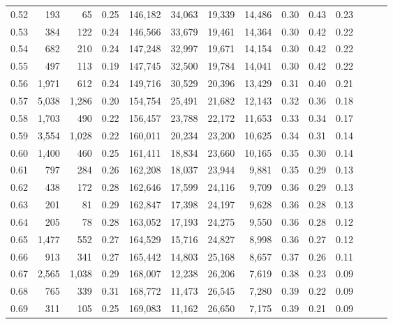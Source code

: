 \begin{tabular}{rrrrrrrrrrrrrr}
0.52 &     193 &     65 &  0.25 &  146,182 &   34,063 &  19,339 &  14,486 &  0.30 &  0.43 &      0.23 \\
0.53 &     384 &    122 &  0.24 &  146,566 &   33,679 &  19,461 &  14,364 &  0.30 &  0.42 &      0.22 \\
0.54 &     682 &    210 &  0.24 &  147,248 &   32,997 &  19,671 &  14,154 &  0.30 &  0.42 &      0.22 \\
0.55 &     497 &    113 &  0.19 &  147,745 &   32,500 &  19,784 &  14,041 &  0.30 &  0.42 &      0.22 \\
0.56 &   1,971 &    612 &  0.24 &  149,716 &   30,529 &  20,396 &  13,429 &  0.31 &  0.40 &      0.21 \\
0.57 &   5,038 &  1,286 &  0.20 &  154,754 &   25,491 &  21,682 &  12,143 &  0.32 &  0.36 &      0.18 \\
0.58 &   1,703 &    490 &  0.22 &  156,457 &   23,788 &  22,172 &  11,653 &  0.33 &  0.34 &      0.17 \\
0.59 &   3,554 &  1,028 &  0.22 &  160,011 &   20,234 &  23,200 &  10,625 &  0.34 &  0.31 &      0.14 \\
0.60 &   1,400 &    460 &  0.25 &  161,411 &   18,834 &  23,660 &  10,165 &  0.35 &  0.30 &      0.14 \\
0.61 &     797 &    284 &  0.26 &  162,208 &   18,037 &  23,944 &   9,881 &  0.35 &  0.29 &      0.13 \\
0.62 &     438 &    172 &  0.28 &  162,646 &   17,599 &  24,116 &   9,709 &  0.36 &  0.29 &      0.13 \\
0.63 &     201 &     81 &  0.29 &  162,847 &   17,398 &  24,197 &   9,628 &  0.36 &  0.28 &      0.13 \\
0.64 &     205 &     78 &  0.28 &  163,052 &   17,193 &  24,275 &   9,550 &  0.36 &  0.28 &      0.12 \\
0.65 &   1,477 &    552 &  0.27 &  164,529 &   15,716 &  24,827 &   8,998 &  0.36 &  0.27 &      0.12 \\
0.66 &     913 &    341 &  0.27 &  165,442 &   14,803 &  25,168 &   8,657 &  0.37 &  0.26 &      0.11 \\
0.67 &   2,565 &  1,038 &  0.29 &  168,007 &   12,238 &  26,206 &   7,619 &  0.38 &  0.23 &      0.09 \\
0.68 &     765 &    339 &  0.31 &  168,772 &   11,473 &  26,545 &   7,280 &  0.39 &  0.22 &      0.09 \\
0.69 &     311 &    105 &  0.25 &  169,083 &   11,162 &  26,650 &   7,175 &  0.39 &  0.21 &      0.09 \\

\end{tabular}
